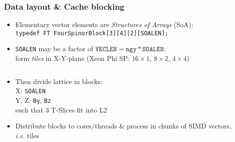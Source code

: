 \documentclass{beamer}
\begin{document}
  \begin{frame}
    \frametitle{Data layout \& Cache blocking}

    \begin{itemize}
      \item Elementary vector elements are \textit{Structures of Arrays} (SoA):\\[2mm]
        \texttt{typedef FT FourSpinorBlock[3][4][2][SOALEN];}
        \vfill
      \item \texttt{SOALEN} may be a factor of $\texttt{VECLEN} = \texttt{ngy} * \texttt{SOALEN}$:\\[2mm]
        form \textit{tiles} in X-Y-plane (Xeon Phi SP: $16\times1$, $8\times2$, $4\times4$)
    \end{itemize}

    \vspace{-3mm}
    \begin{columns}[T]
      \begin{column}{.5\textwidth}
        \begin{center}
          \begin{itemize}
            \item Then divide lattice in blocks:\\[2mm]
              \; X: \;\texttt{SOALEN}\\
              \; Y, Z: \;\texttt{By}, \texttt{Bz}\\[2mm]
              such that 3 T-Slices fit into L2
              \vfill
              \vspace{3mm}
            \item Distribute blocks to cores/threads \& process in chunks
              of SIMD vectors, \textit{i.e.} tiles
              \vfill
          \end{itemize}
        \end{center}
      \end{column}
      \begin{column}{.5\textwidth}
        \begin{center}
          \vfill
        \end{center}
      \end{column}
    \end{columns}

  \end{frame}

\end{document}
